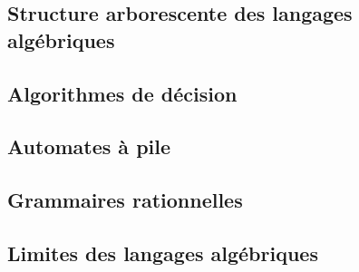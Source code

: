\subsection{Structure arborescente des langages algébriques}




 
\subsection{Algorithmes de décision}




 
\subsection{Automates à pile}












%

\subsection{Grammaires rationnelles}







 
\subsection{Limites des langages algébriques}



 
